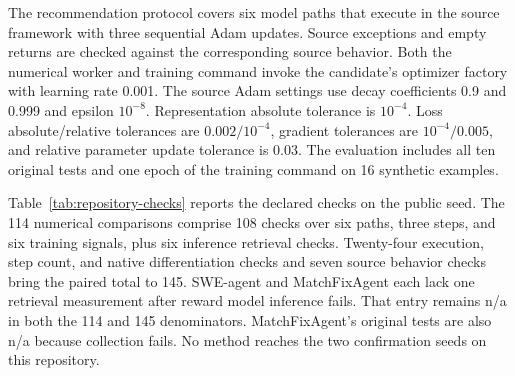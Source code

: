 \documentclass{article}
\begin{document}
The recommendation protocol covers six model paths that execute in the source framework with three sequential Adam updates. Source exceptions and empty returns are checked against the corresponding source behavior. Both the numerical worker and training command invoke the candidate's optimizer factory with learning rate 0.001. The source Adam settings use decay coefficients 0.9 and 0.999 and epsilon $10^{-8}$. Representation absolute tolerance is $10^{-4}$. Loss absolute/relative tolerances are $0.002/10^{-4}$, gradient tolerances are $10^{-4}/0.005$, and relative parameter update tolerance is 0.03. The evaluation includes all ten original tests and one epoch of the training command on 16 synthetic examples.

Table~\ref{tab:repository-checks} reports the declared checks on the public seed. The 114 numerical comparisons comprise 108 checks over six paths, three steps, and six training signals, plus six inference retrieval checks. Twenty-four execution, step count, and native differentiation checks and seven source behavior checks bring the paired total to 145. SWE-agent and MatchFixAgent each lack one retrieval measurement after reward model inference fails. That entry remains n/a in both the 114 and 145 denominators. MatchFixAgent's original tests are also n/a because collection fails. No method reaches the two confirmation seeds on this repository.
\end{document}
